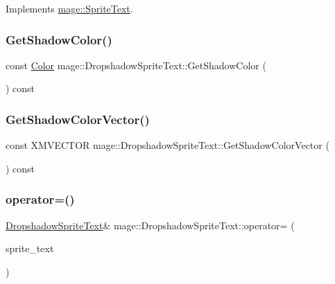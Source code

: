 Implements \hyperlink{classmage_1_1_sprite_text_a45d5ac8410d5a46b26e8491946a2ad9e}{mage\+::\+Sprite\+Text}.

\hypertarget{classmage_1_1_dropshadow_sprite_text_a776c11dfe60ad8c0c6f356c5f0f95af6}{}\label{classmage_1_1_dropshadow_sprite_text_a776c11dfe60ad8c0c6f356c5f0f95af6} 
\subsubsection{\texorpdfstring{Get\+Shadow\+Color()}{GetShadowColor()}}
{\footnotesize\ttfamily const \hyperlink{structmage_1_1_color}{Color} mage\+::\+Dropshadow\+Sprite\+Text\+::\+Get\+Shadow\+Color (\begin{DoxyParamCaption}{ }\end{DoxyParamCaption}) const}

\hypertarget{classmage_1_1_dropshadow_sprite_text_aedba26fc177c68e0553785a731d3d391}{}\label{classmage_1_1_dropshadow_sprite_text_aedba26fc177c68e0553785a731d3d391} 
\subsubsection{\texorpdfstring{Get\+Shadow\+Color\+Vector()}{GetShadowColorVector()}}
{\footnotesize\ttfamily const X\+M\+V\+E\+C\+T\+OR mage\+::\+Dropshadow\+Sprite\+Text\+::\+Get\+Shadow\+Color\+Vector (\begin{DoxyParamCaption}{ }\end{DoxyParamCaption}) const\hspace{0.3cm}{\ttfamily [private]}}

\hypertarget{classmage_1_1_dropshadow_sprite_text_acc96ceb07c46894d731e86b735d3b594}{}\label{classmage_1_1_dropshadow_sprite_text_acc96ceb07c46894d731e86b735d3b594} 
\subsubsection{\texorpdfstring{operator=()}{operator=()}\hspace{0.1cm}{\footnotesize\ttfamily [1/2]}}
{\footnotesize\ttfamily \hyperlink{classmage_1_1_dropshadow_sprite_text}{Dropshadow\+Sprite\+Text}\& mage\+::\+Dropshadow\+Sprite\+Text\+::operator= (\begin{DoxyParamCaption}\item[{const \hyperlink{classmage_1_1_dropshadow_sprite_text}{Dropshadow\+Sprite\+Text} \&}]{sprite\+\_\+text }\end{DoxyParamCaption})\hspace{0.3cm}{\ttfamily [default]}}

